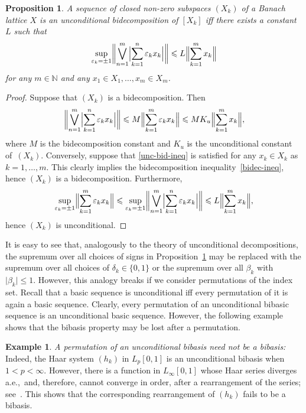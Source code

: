 \documentclass[12pt]{amsart}
\theoremstyle{plain}
\newtheorem{proposition}[theorem]{Proposition}
\theoremstyle{definition}
\newtheorem{example}[theorem]{Example}
\newcommand{\abs}[1]{\lvert#1\rvert}
\newcommand{\Bigabs}[1]{\Bigl\lvert#1\Bigr\rvert}
\newcommand{\Bignorm}[1]{\Bigl\lVert#1\Bigr\rVert}
\newcommand{\biggnorm}[1]{\biggl\lVert#1\biggr\rVert}
\renewcommand{\le}{\leqslant}
\begin{document}
\begin{proposition}\label{unc-bid}
  A sequence of closed non-zero subspaces $(X_k)$ of a Banach lattice
  $X$ is an unconditional bidecomposition of $[X_k]$ iff there exists
  a constant $L$ such that
  \begin{equation}\label{unc-bid-ineq}
    \sup\limits_{\varepsilon_k=\pm 1}\biggnorm{\bigvee_{n=1}^m\Bigabs{
        \sum_{k=1}^n \varepsilon_kx_k}}
    \le L\Bignorm{\sum_{k=1}^mx_k}
  \end{equation}
  for any $m\in \mathbb{N}$ and any $x_1\in X_1,\dots,x_m\in X_m$.
\end{proposition}

\begin{proof}
  Suppose that $(X_k)$ is a bidecomposition. Then
  \begin{displaymath}
    \biggnorm{\bigvee_{n=1}^m\Bigabs{
        \sum_{k=1}^n \varepsilon_kx_k}}
    \le M\Bignorm{\sum_{k=1}^m\varepsilon_k x_k}
    \le MK_u\Bignorm{\sum_{k=1}^mx_k},
  \end{displaymath}
  where $M$ is the bidecomposition constant and $K_u$ is the unconditional
  constant of~$(X_k)$. Conversely, suppose that \eqref{unc-bid-ineq}
  is satisfied for any $x_k\in X_k$ as $k=1,\dots,m$. This clearly
  implies the bidecomposition inequality~\eqref{bidec-ineq}, hence $(X_k)$ is a
  bidecomposition. Furthermore,
  \begin{displaymath}
    \sup\limits_{\varepsilon_k=\pm 1}\Bignorm{
     \sum_{k=1}^m \varepsilon_kx_k}
    \le\sup\limits_{\varepsilon_k=\pm 1}\biggnorm{\bigvee_{n=1}^m\Bigabs{
     \sum_{k=1}^n \varepsilon_kx_k}}
    \le L\Bignorm{\sum_{k=1}^mx_k},
  \end{displaymath}
  hence $(X_k)$ is unconditional.
\end{proof}

It is easy to see that, analogously to the theory of unconditional
decompositions, the supremum over all choices of signs in
Proposition~\ref{unc-bid} may be replaced with the supremum over all
choices of $\delta_k\in \{0,1\}$ or the supremum over all $ \beta_k$
with $\abs{\beta_k}\le 1$.  However, this analogy breaks if we
consider permutations of the index set. Recall that a basic sequence
is unconditional iff every permutation of it is again a basic
sequence. Clearly, every permutation of an unconditional bibasic
sequence is an unconditional basic sequence. However, the following
example shows that the bibasis property may be lost after a
permutation.

\begin{example}
  \textit{A permutation of an unconditional bibasis need not be a
    bibasis:} Indeed, the Haar system $(h_k)$ in $L_p[0,1]$ is an
  unconditional bibasis when $1<p<\infty$. However, there is a
  function in $L_\infty[0,1]$ whose Haar series diverges a.e.,\ and,
  therefore, cannot converge in order, after a rearrangement of the
  series; see~\cite[p.~96]{Kashin:89}.  This shows that the
  corresponding rearrangement of $(h_k)$ fails to be a bibasis.
\end{example}
\end{document}
